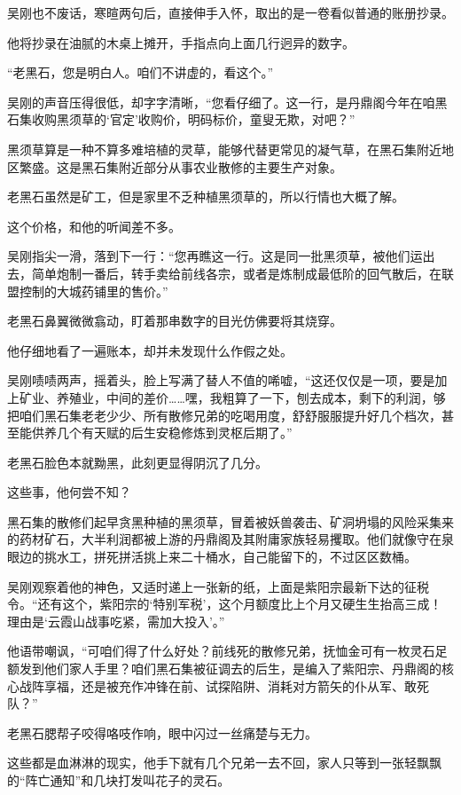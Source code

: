 吴刚也不废话，寒暄两句后，直接伸手入怀，取出的是一卷看似普通的账册抄录。

他将抄录在油腻的木桌上摊开，手指点向上面几行迥异的数字。

“老黑石，您是明白人。咱们不讲虚的，看这个。”

吴刚的声音压得很低，却字字清晰，“您看仔细了。这一行，是丹鼎阁今年在咱黑石集收购黑须草的‘官定’收购价，明码标价，童叟无欺，对吧？”

黑须草算是一种不算多难培植的灵草，能够代替更常见的凝气草，在黑石集附近地区繁盛。这是黑石集附近部分从事农业散修的主要生产对象。

老黑石虽然是矿工，但是家里不乏种植黑须草的，所以行情也大概了解。

这个价格，和他的听闻差不多。

吴刚指尖一滑，落到下一行：“您再瞧这一行。这是同一批黑须草，被他们运出去，简单炮制一番后，转手卖给前线各宗，或者是炼制成最低阶的回气散后，在联盟控制的大城药铺里的售价。”

老黑石鼻翼微微翕动，盯着那串数字的目光仿佛要将其烧穿。

他仔细地看了一遍账本，却并未发现什么作假之处。

吴刚啧啧两声，摇着头，脸上写满了替人不值的唏嘘，“这还仅仅是一项，要是加上矿业、养殖业，中间的差价……嘿，我粗算了一下，刨去成本，剩下的利润，够把咱们黑石集老老少少、所有散修兄弟的吃喝用度，舒舒服服提升好几个档次，甚至能供养几个有天赋的后生安稳修炼到灵枢后期了。”

老黑石脸色本就黝黑，此刻更显得阴沉了几分。

这些事，他何尝不知？

黑石集的散修们起早贪黑种植的黑须草，冒着被妖兽袭击、矿洞坍塌的风险采集来的药材矿石，大半利润都被上游的丹鼎阁及其附庸家族轻易攫取。他们就像守在泉眼边的挑水工，拼死拼活挑上来二十桶水，自己能留下的，不过区区数桶。

吴刚观察着他的神色，又适时递上一张新的纸，上面是紫阳宗最新下达的征税令。“还有这个，紫阳宗的‘特别军税’，这个月额度比上个月又硬生生抬高三成！理由是‘云霞山战事吃紧，需加大投入’。”

他语带嘲讽，“可咱们得了什么好处？前线死的散修兄弟，抚恤金可有一枚灵石足额发到他们家人手里？咱们黑石集被征调去的后生，是编入了紫阳宗、丹鼎阁的核心战阵享福，还是被充作冲锋在前、试探陷阱、消耗对方箭矢的仆从军、敢死队？”

老黑石腮帮子咬得咯吱作响，眼中闪过一丝痛楚与无力。

这些都是血淋淋的现实，他手下就有几个兄弟一去不回，家人只等到一张轻飘飘的“阵亡通知”和几块打发叫花子的灵石。

